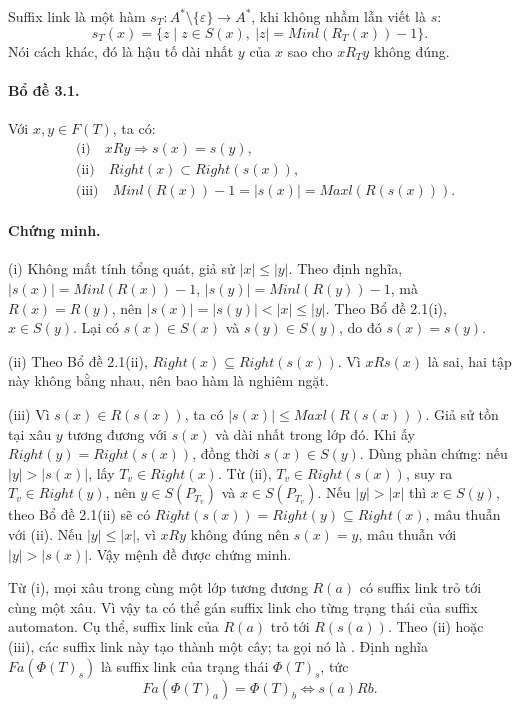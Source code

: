 \documentclass[11pt]{article}
\begin{document}
Suffix link là một hàm \(s_T:A^*\setminus\{\varepsilon\}\to A^*\), khi không
nhầm lẫn viết là \(s\):
\[
  s_T(x)=\{z\mid z\in S(x),\ |z|=Minl(R_T(x))-1\}.
\]
Nói cách khác, đó là hậu tố dài nhất \(y\) của \(x\) sao cho \(xR_Ty\) không
đúng.

\paragraph{Bổ đề 3.1.}
Với \(x,y\in F(T)\), ta có:
\[
\begin{aligned}
&\text{(i)}\quad xRy\Rightarrow s(x)=s(y),\\
&\text{(ii)}\quad Right(x)\subset Right(s(x)),\\
&\text{(iii)}\quad Minl(R(x))-1=|s(x)|=Maxl(R(s(x))).
\end{aligned}
\]

\paragraph{Chứng minh.}
(i) Không mất tính tổng quát, giả sử \(|x|\le |y|\). Theo định nghĩa,
\(|s(x)|=Minl(R(x))-1\), \(|s(y)|=Minl(R(y))-1\), mà \(R(x)=R(y)\), nên
\(|s(x)|=|s(y)|<|x|\le |y|\). Theo Bổ đề 2.1(i), \(x\in S(y)\). Lại có
\(s(x)\in S(x)\) và \(s(y)\in S(y)\), do đó \(s(x)=s(y)\).

(ii) Theo Bổ đề 2.1(ii), \(Right(x)\subseteq Right(s(x))\). Vì \(xRs(x)\) là sai,
hai tập này không bằng nhau, nên bao hàm là nghiêm ngặt.

(iii) Vì \(s(x)\in R(s(x))\), ta có \(|s(x)|\le Maxl(R(s(x)))\). Giả sử tồn tại
xâu \(y\) tương đương với \(s(x)\) và dài nhất trong lớp đó. Khi ấy
\(Right(y)=Right(s(x))\), đồng thời \(s(x)\in S(y)\). Dùng phản chứng: nếu
\(|y|>|s(x)|\), lấy \(T_v\in Right(x)\). Từ (ii), \(T_v\in Right(s(x))\), suy ra
\(T_v\in Right(y)\), nên \(y\in S(P_{T_v})\) và \(x\in S(P_{T_v})\). Nếu
\(|y|>|x|\) thì \(x\in S(y)\), theo Bổ đề 2.1(ii) sẽ có
\(Right(s(x))=Right(y)\subseteq Right(x)\), mâu thuẫn với (ii). Nếu
\(|y|\le |x|\), vì \(xRy\) không đúng nên \(s(x)=y\), mâu thuẫn với
\(|y|>|s(x)|\). Vậy mệnh đề được chứng minh.

Từ (i), mọi xâu trong cùng một lớp tương đương \(R(a)\) có suffix link trỏ tới
cùng một xâu. Vì vậy ta có thể gán suffix link cho từng trạng thái của suffix
automaton. Cụ thể, suffix link của \(R(a)\) trỏ tới \(R(s(a))\). Theo (ii) hoặc
(iii), các suffix link này tạo thành một cây; ta gọi nó là .
Định nghĩa \(Fa(\Phi(T)_s)\) là suffix link của trạng thái \(\Phi(T)_s\), tức
\[
  Fa(\Phi(T)_a)=\Phi(T)_b \Longleftrightarrow s(a)Rb.
\]
\end{document}
